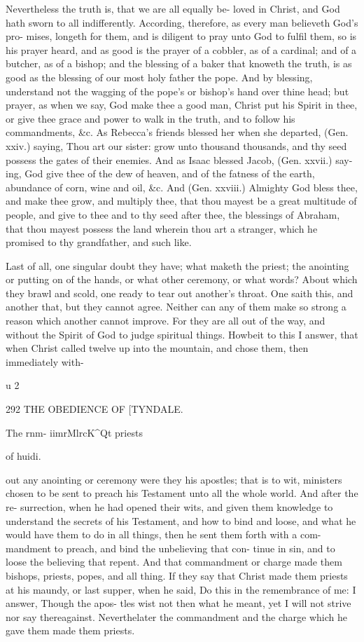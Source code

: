 \documentclass{custom}
\begin{document}
{{Nevertheless the truth is, that we are all equally be- 
loved in Christ, and God hath sworn to all indifferently. 
According, therefore, as every man believeth God's pro- 
mises, longeth for them, and is diligent to pray unto God 
to fulfil them, so is his prayer heard, and as good is the 
prayer of a cobbler, as of a cardinal; and of a butcher, 
as of a bishop; and the blessing of a baker that knoweth 
the truth, is as good as the blessing of our most holy 
father the pope. And by blessing, understand not the
wagging of the pope's or bishop's hand over thine head;
but prayer, as when we say, God make thee a good man,
Christ put his Spirit in thee, or give thee grace and power 
to walk in the truth, and to follow his commandments, 
&c. As Rebecca's friends blessed her when she departed, 
(Gen. xxiv.) saying, Thou art our sister: grow unto 
thousand thousands, and thy seed possess the gates of their 
enemies. And as Isaac blessed Jacob, (Gen. xxvii.) say- 
ing, God give thee of the dew of heaven, and of the fatness 
of the earth, abundance of corn, wine and oil, &c. And 
(Gen. xxviii.) Almighty God bless thee, and make thee 
grow, and multiply thee, that thou mayest be a great 
multitude of people, and give to thee and to thy seed 
after thee, the blessings of Abraham, that thou mayest 
possess the land wherein thou art a stranger, which he 
promised to thy grandfather, and such like. 

Last of all, one singular doubt they have; what maketh 
the priest; the anointing or putting on of the hands, or 
what other ceremony, or what words? About which they 
brawl and scold, one ready to tear out another's throat. 
One saith this, and another that, but they cannot agree. 
Neither can any of them make so strong a reason which 
another cannot improve. For they are all out of the way, 
and without the Spirit of God to judge spiritual things. 
Howbeit to this I answer, that when Christ called twelve up 
into the mountain, and chose them, then immediately with- 

u 2 


292
THE OBEDIENCE OF
[TYNDALE.

The rnm- 
iimrMlrcK^Qt 
priests 

of huidi. 

out any anointing or ceremony were they his apostles; 
that is to wit, ministers chosen to be sent to preach his 
Testament unto all the whole world. And after the re- 
surrection, when he had opened their wits, and given 
them knowledge to understand the secrets of his Testament, 
and how to bind and loose, and what he would have them 
to do in all things, then he sent them forth with a com- 
mandment to preach, and bind the unbelieving that con- 
tinue in sin, and to loose the believing that repent. And 
that commandment or charge made them bishops, priests, 
popes, and all thing. If they say that Christ made them 
priests at his maundy, or last supper, when he said, Do 
this in the remembrance of me: I answer, Though the apos- 
tles wist not then what he meant, yet I will not strive nor 
say thereagainst. Neverthelater the commandment and the 
charge which he gave them made them priests. 

}}
\end{document}
